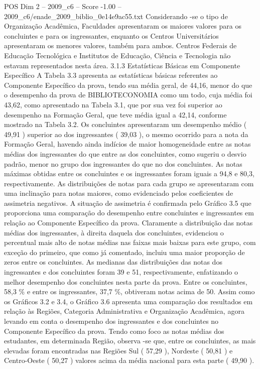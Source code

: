 \begin{textsample}{POS Dim 2 – 2009\_c6 – Score -1.00 – 2009\_c6/enade\_2009\_biblio\_0e14e9ac55.txt}
Considerando -se o tipo de Organização Acadêmica, Faculdades apresentaram os maiores valores para os concluintes e para os ingressantes, enquanto os Centros Universitários apresentaram os menores valores, também para ambos.
Centros Federais de Educação Tecnológica e Institutos de Educação, Ciência e Tecnologia não estavam representados nesta área. 3.1.3 Estatísticas Básicas em Componente Específico A Tabela 3.3 apresenta as estatísticas básicas referentes ao Componente Específico da prova, tendo sua média geral, de 44,16, menor do que o desempenho da prova de BIBLIOTECONOMIA como um todo, cuja média foi 43,62, como apresentado na Tabela 3.1, que por sua vez foi superior ao desempenho na Formação Geral, que teve média igual a 42,14, conforme mostrado na Tabela 3.2.
Os concluintes apresentaram um desempenho médio ( 49,91 ) superior ao dos ingressantes ( 39,03 ), o mesmo ocorrido para a nota da Formação Geral, havendo ainda indícios de maior homogeneidade entre as notas médias dos ingressantes do que entre as dos concluintes, como sugeriu o desvio padrão, menor no grupo dos ingressantes do que no dos concluintes.
As notas máximas obtidas entre os concluintes e os ingressantes foram iguais a 94,8 e 80,3, respectivamente.
As distribuições de notas para cada grupo se apresentaram com uma inclinação para notas maiores, como evidenciado pelos coeficientes de assimetria negativos.
A situação de assimetria é confirmada pelo Gráfico 3.5 que proporciona uma comparação do desempenho entre concluintes e ingressantes em relação ao Componente Específico da prova.
Claramente a distribuição das notas médias dos ingressantes, à direita daquela dos concluintes, evidenciou o percentual mais alto de notas médias nas faixas mais baixas para este grupo, com exceção do primeiro, que como já comentado, incluiu uma maior proporção de zeros entre os concluintes.
As medianas das distribuições das notas dos ingressantes e dos concluintes foram 39 e 51, respectivamente, enfatizando o melhor desempenho dos concluintes nesta parte da prova.
Entre os concluintes, 58,3 \% e entre os ingressantes, 37,7 \%, obtiveram notas acima de 50.
Assim como os Gráficos 3.2 e 3.4, o Gráfico 3.6 apresenta uma comparação dos resultados em relação às Regiões, Categoria Administrativa e Organização Acadêmica, agora levando em conta o desempenho dos ingressantes e dos concluintes no Componente Específico da prova.
Tendo como foco as notas médias dos estudantes, em determinada Região, observa -se que, entre os concluintes, as mais elevadas foram encontradas nas Regiões Sul ( 57,29 ), Nordeste ( 50,81 ) e Centro-Oeste ( 50,27 ) valores acima da média nacional para esta parte ( 49,90 ).

\end{textsample}
